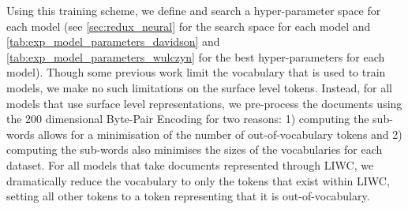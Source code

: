 Using this training scheme, we define and search a hyper-parameter space for each model (see \cref{sec:redux_neural} for the search space for each model and \cref{tab:exp_model_parameters_davidson} and \cref{tab:exp_model_parameters_wulczyn} for the best hyper-parameters for each model). Though some previous work \cite{Waseem:2018, CITE: Other papers that restrict vocabulary sizes} limit the vocabulary that is used to train models, we make no such limitations on the surface level tokens. Instead, for all models that use surface level representations, we pre-process the documents using the 200 dimensional Byte-Pair Encoding \cite{Heinzerling:2018} for two reasons: 1) computing the sub-words allows for a minimisation of the number of out-of-vocabulary tokens and 2) computing the sub-words also minimises the sizes of the vocabularies for each dataset. For all models that take documents represented through LIWC, we dramatically reduce the vocabulary to only the tokens that exist within LIWC, setting all other tokens to a token representing that it is out-of-vocabulary.




